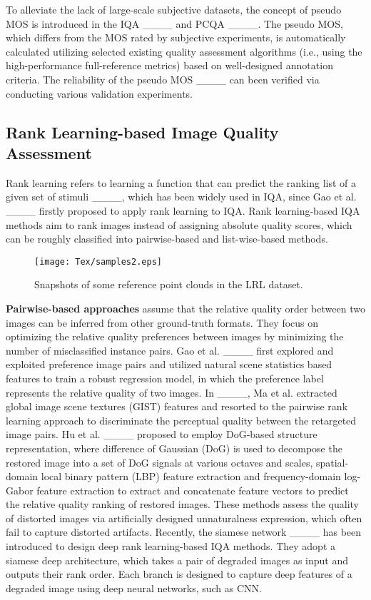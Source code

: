 To alleviate the lack of large-scale subjective datasets, the concept of pseudo MOS is introduced in the IQA ____ and PCQA ____. 
The pseudo MOS, which differs from the MOS rated by subjective experiments, is automatically calculated utilizing selected existing quality assessment algorithms (i.e., using the high-performance full-reference metrics) based on well-designed annotation criteria.
The reliability of the pseudo MOS 
 ____ can been verified via conducting various validation experiments.

\subsection{Rank Learning-based Image Quality Assessment}

Rank learning refers to learning a function that can predict the ranking list of a given set of stimuli ____, which has been widely used in IQA, since Gao et al. ____ firstly proposed to apply rank learning to IQA.
Rank learning-based IQA methods aim to rank images instead of assigning absolute quality scores, which can be roughly classified into pairwise-based and list-wise-based methods.

\begin{figure*}[tbp]
	\centering
	\texttt{[image: Tex/samples2.eps]}
	\caption{Snapshots of some reference point clouds in the LRL dataset.}
	\label{fig:samples}
\end{figure*}

\textbf{Pairwise-based approaches} assume that the relative quality order between two images can be inferred from other ground-truth formats. 
They focus on optimizing the relative quality preferences between images by minimizing the number of misclassified instance pairs.
Gao et al. ____ first explored and exploited preference image pairs and utilized natural scene statistics based features to train a robust regression model, in which the preference label represents the relative quality of two images.
In ____, Ma et al. extracted global image scene textures (GIST) features and resorted to the pairwise rank learning approach to discriminate the perceptual quality between the retargeted image pairs.
Hu et al. ____ proposed to employ DoG-based structure representation, where difference of Gaussian (DoG) is used to decompose the restored image into a set of DoG signals at various octaves and scales, spatial-domain local binary pattern (LBP) feature extraction and frequency-domain log-Gabor feature extraction to extract and concatenate feature vectors to predict the relative quality ranking of restored images.
These methods assess the quality of distorted images via artificially designed unnaturalness expression, which often fail to capture distorted artifacts.
Recently, the siamese network ____ has been introduced to design deep rank learning-based IQA methods.
They adopt a siamese deep architecture, which takes a pair of degraded images as input and outputs their rank order. 
Each branch is designed to capture deep features of a degraded image using deep neural networks, such as CNN.

